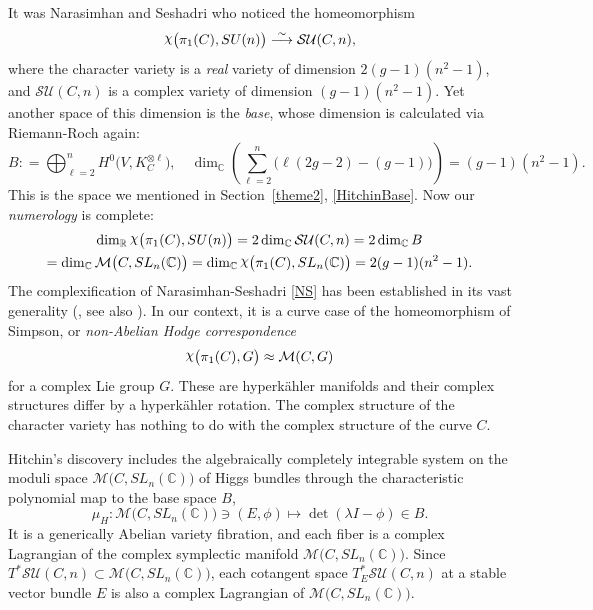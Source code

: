 \documentclass{amsart}
\theoremstyle{definition}
\numberwithin{equation}{section}
\numberwithin{figure}{section}
\def\rchi{{\hbox{\raise1.5pt\hbox{$\chi$}}}}
\def\tensor{\otimes}
\def\lam{\lambda}
\newcommand{\be}{\begin{equation}}
\newcommand{\ee}{\end{equation}}
\newcommand{\bC}{{\mathbb{C}}}
\newcommand{\bR}{{\mathbb{R}}}
\newcommand{\cM}{{\mathcal{M}}}
\newcommand{\cS}{{\mathcal{S}}}
\newcommand{\cU}{{\mathcal{U}}}
\newcommand{\lrar}{\longrightarrow}
\begin{document}
It was Narasimhan and Seshadri \cite{NS} who noticed the homeomorphism 
\be
\label{NS}
\rchi \big(\pi_1(C), SU(n)\big) \overset{\sim}{\lrar} \cS\cU(C,n),
\ee
where the character variety is a \emph{real} variety of 
dimension $2(g-1)(n^2-1)$, and $\cS\cU(C,n)$ is a complex
variety of dimension $(g-1)(n^2-1)$. Yet another space of this dimension
is the \emph{base}, whose dimension is calculated via Riemann-Roch again:
\be
\label{base}
B: = \bigoplus_{\ell=2}^n H^0\big(V, K_C^{\tensor \ell}\big),
\quad \dim_\bC \left(\sum _{\ell=2}^n \big(\ell(2g-2) -(g-1)\big)\right) =(g-1)(n^2-1).
\ee
This is the space we mentioned in Section~\ref{theme2},
\eqref{HitchinBase}. Now our \emph{numerology} is complete:
\begin{multline*}
\dim_\bR \rchi \big(\pi_1(C), SU(n)\big)=
2\dim_\bC \cS\cU(C,n) = 2 \dim_\bC B \\= \dim_\bC \cM\big(C,SL_n(\bC)\big)
= \dim_\bC \rchi \big(\pi_1(C), SL_n(\bC)\big) = 2(g-1)(n^2-1).
\end{multline*}
The complexification of Narasimhan-Seshadri \eqref{NS}
 has been established in its vast generality
(\cite{Cor1988, Don1987, H1,Sim1992,Sim1994a,Sim1994b, Sim1997}, see also
\cite{Mochizuki}).
In our context, it is a curve case of the
homeomorphism of Simpson, or \emph{non-Abelian
Hodge correspondence} 
\be
\label{nah}
\rchi \big(\pi_1(C), G\big) \approx \cM(C,G)
\ee
for a complex Lie group $G$. These are hyperk\"ahler manifolds 
and their complex structures differ by a hyperk\"ahler rotation. 
The complex structure of the
character variety has nothing to do with the complex structure of the
curve $C$.

Hitchin's discovery \cite{H1} includes the algebraically completely
integrable system on the moduli space $\cM\big(C,SL_n(\bC)\big)$ of 
Higgs bundles through the characteristic polynomial map to the base 
space $B$,
\be
\label{charmap}
\mu_H: \cM\big(C,SL_n(\bC)\big) \owns (E,\phi) \longmapsto \det(\lam I - \phi)\in B.
\ee
It is a generically Abelian variety fibration, and
each fiber  is a complex Lagrangian of the 
complex symplectic manifold $\cM\big(C,SL_n(\bC)\big)$. 
Since $T^*\cS\cU(C,n)\subset \cM\big(C,SL_n(\bC)\big)$,
each cotangent space $T_E^*\cS\cU(C,n)$ at a stable vector bundle $E$
is also a complex Lagrangian of  $\cM\big(C,SL_n(\bC)\big)$. 
\end{document}
